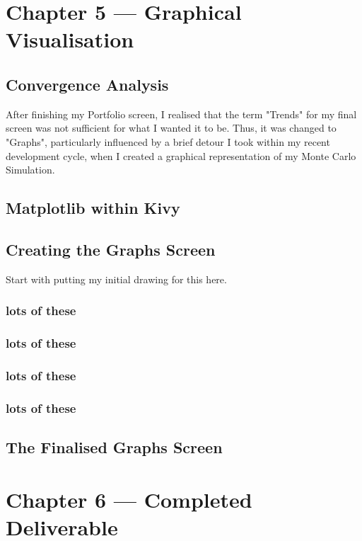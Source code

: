 \documentclass{article}
\begin{document}
\section{Chapter 5 --- Graphical Visualisation}

\subsection{Convergence Analysis}
After finishing my Portfolio screen, I realised that the term "Trends" for my final screen was not sufficient for what I wanted it to be. Thus, it was changed to "Graphs", particularly influenced by a brief detour I took within my recent development cycle, when I created a graphical representation of my Monte Carlo Simulation.


\subsection{Matplotlib within Kivy}

\subsection{Creating the Graphs Screen}
Start with putting my initial drawing for this here.

\subsubsection{lots of these}

\subsubsection{lots of these}

\subsubsection{lots of these}

\subsubsection{lots of these}

\subsection{The Finalised Graphs Screen}


\section{Chapter 6 --- Completed Deliverable}
\end{document}
